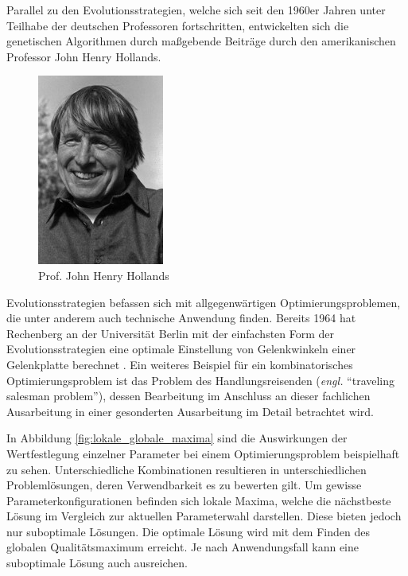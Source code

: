 Parallel zu den Evolutionsstrategien, welche sich seit den 1960er Jahren unter Teilhabe der deutschen Professoren fortschritten, entwickelten sich die genetischen Algorithmen durch maßgebende Beiträge durch den amerikanischen Professor John Henry Hollands.

\begin{figure}[H]
\centering
\includegraphics[height=0.6\textwidth]{img/Prof_John_Henry_Hollands.jpg}
\caption[Prof. John Henry Hollands]{Prof. John Henry Hollands \protect\footnotemark}
\label{fig:ingorechenberg}
\end{figure}

Evolutionsstrategien befassen sich mit allgegenwärtigen Optimierungsproblemen, die unter anderem auch technische Anwendung finden.
Bereits 1964 hat Rechenberg an der Universität Berlin mit der einfachsten Form der Evolutionsstrategien eine optimale Einstellung von Gelenkwinkeln einer Gelenkplatte berechnet \cite{schoeneburg}.
Ein weiteres Beispiel für ein kombinatorisches Optimierungsproblem ist das Problem des Handlungsreisenden (\textit{engl.} \enquote{traveling salesman problem}), dessen Bearbeitung im Anschluss an dieser fachlichen Ausarbeitung in einer gesonderten Ausarbeitung im Detail betrachtet wird.

In Abbildung \ref{fig:lokale_globale_maxima} sind die Auswirkungen der Wertfestlegung einzelner Parameter bei einem Optimierungsproblem beispielhaft zu sehen.
Unterschiedliche Kombinationen resultieren in unterschiedlichen Problemlösungen, deren Verwendbarkeit es zu bewerten gilt.
Um gewisse Parameterkonfigurationen befinden sich lokale Maxima, welche die nächstbeste Lösung im Vergleich zur aktuellen Parameterwahl darstellen. Diese bieten jedoch nur suboptimale Lösungen. Die optimale Lösung wird mit dem Finden des globalen Qualitätsmaximum erreicht. Je nach Anwendungsfall kann eine suboptimale Lösung auch ausreichen.

